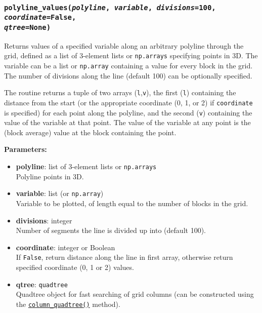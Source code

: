 \begin{snugshade}\subsubsection{\texttt{polyline\_values(\emph{polyline}, \emph{variable}, \emph{divisions}=100, \emph{coordinate}=\texttt{False},\\
      \emph{qtree}=None)}}\end{snugshade}
\label{sec:mulgrid:polyline_values}

Returns values of a specified variable along an arbitrary polyline through the grid, defined as a list of 3-element lists or \texttt{np.arrays} specifying points in 3D.  The variable can be a list or \texttt{np.array} containing a value for every block in the grid.  The number of divisions along the line (default 100) can be optionally specified.

The routine returns a tuple of two arrays (\texttt{l},\texttt{v}), the first (\texttt{l}) containing the distance from the start (or the appropriate coordinate (0, 1, or 2) if \texttt{coordinate} is specified) for each point along the polyline, and the second (\texttt{v}) containing the value of the variable at that point.  The value of the variable at any point is the (block average) value at the block containing the point.


\textbf{Parameters:}
\begin{itemize}
\item \textbf{polyline}: list of 3-element lists or \texttt{np.arrays}\\
  Polyline points in 3D.
\item \textbf{variable}: list (or \texttt{np.array})\\
  Variable to be plotted, of length equal to the number of blocks in the grid.
\item \textbf{divisions}: integer\\
  Number of segments the line is divided up into (default 100).
\item \textbf{coordinate}: integer or Boolean\\
  If \texttt{False}, return distance along the line in first array, otherwise return specified coordinate (0, 1 or 2) values.
\item \textbf{qtree}: \texttt{quadtree}\\
  Quadtree object for fast searching of grid columns (can be constructed using the \hyperref[sec:mulgrid:column_quadtree]{\texttt{column\_quadtree()}} method).
\end{itemize}

